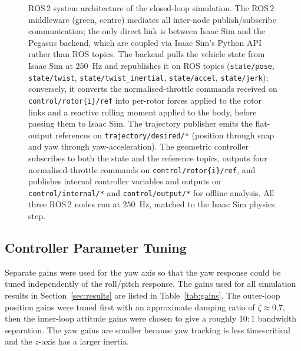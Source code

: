 \documentclass[11pt]{article}
\theoremstyle{remark}
\begin{document}
\begin{figure}[H]
\caption{ROS\,2 system architecture of the closed-loop simulation. The ROS\,2 middleware (green, centre) mediates all inter-node publish/subscribe communication; the only direct link is between Isaac Sim and the Pegasus backend, which are coupled via Isaac Sim's Python API rather than ROS topics. The backend pulls the vehicle state from Isaac Sim at $250$~Hz and republishes it on ROS topics (\texttt{state/pose}, \texttt{state/twist}, \texttt{state/twist\_inertial}, \texttt{state/accel}, \texttt{state/jerk}); conversely, it converts the normalised-throttle commands received on \texttt{control/rotor\{i\}/ref} into per-rotor forces applied to the rotor links and a reactive rolling moment applied to the body, before passing them to Isaac Sim. The trajectory publisher emits the flat-output references on \texttt{trajectory/desired/*} (position through snap and yaw through yaw-acceleration). The geometric controller subscribes to both the state and the reference topics, outputs four normalised-throttle commands on \texttt{control/rotor\{i\}/ref}, and publishes internal controller variables and outputs on \texttt{control/internal/*} and \texttt{control/output/*} for offline analysis. All three ROS\,2 nodes run at $250$~Hz, matched to the Isaac Sim physics step.}
\label{fig:block-diagram}
\end{figure}

\subsection{Controller Parameter Tuning}
Separate gains were used for the yaw axis so that the yaw response could be tuned independently of the roll/pitch response. The gains used for all simulation results in Section~\ref{sec:results} are listed in Table~\ref{tab:gains}. The outer-loop position gains were tuned first with an approximate damping ratio of $\zeta \approx 0.7$, then the inner-loop attitude gains were chosen to give a roughly $10\!:\!1$ bandwidth separation. The yaw gains are smaller because yaw tracking is less time-critical and the $z$-axis has a larger inertia.
\end{document}
